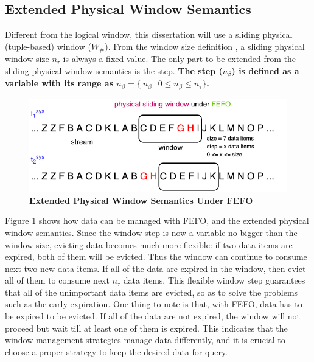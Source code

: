 \subsection{Extended Physical Window Semantics}
Different from the logical window, this dissertation will use a sliding physical (tuple-based) window ($W_{\#}$).
From the window size definition \cite{tangwongsan2015general}, a sliding physical window size $n_{\tau}$ is always a fixed value.
The only part to be extended from the sliding physical window semantics is the step. 
\textbf{The step ($n_{\beta}$) is defined as a variable with its range as ${n_{\beta} = \{\ n_{\beta} \ |\ 0 \leq n_{\beta} \leq n_{\tau}}\}$.}

\begin{figure}[!htbp]
	\centering
    \includegraphics[width=5in]{img/3-psewstu.pdf}
    \caption{\textbf{Extended Physical Window Semantics Under FEFO}}
    \label{fig:3-psewstu}
\end{figure}

Figure \ref{fig:3-psewstu} shows how data can be managed with FEFO, and the extended physical window semantics. 
Since the window step is now a variable no bigger than the window size, evicting data becomes much more flexible: if two data items are expired, both of them will be evicted. 
Thus the window can continue to consume next two new data items. 
If all of the data are expired in the window, then evict all of them to consume next $n_{\tau}$ data items. 
This flexible window step guarantees that all of the unimportant data items are evicted, so as to solve the problems such as the early expiration. 
One thing to note is that, with FEFO, data has to be expired to be evicted.
If all of the data are not expired, the window will not proceed but wait till at least one of them is expired. 
This indicates that the window management strategies manage data differently, and it is crucial to choose a proper strategy to keep the desired data for query.
%
